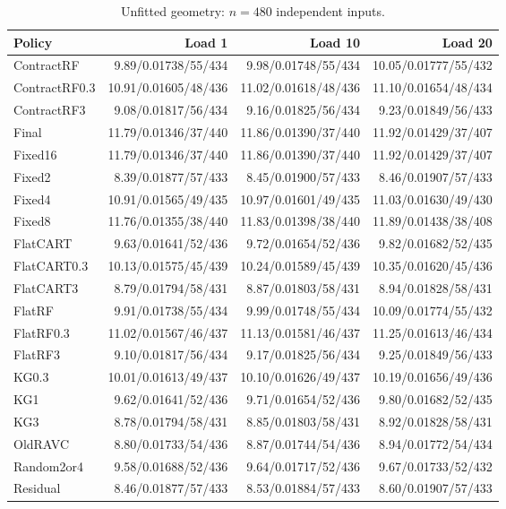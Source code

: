 \begin{table}[!htbp]\centering\scriptsize
\caption{Unfitted geometry: $n=480$ independent inputs.}\label{supp:confirmgeometry_confirmation}
\begin{tabular}{@{}lrrr@{}}\toprule
Policy & Load 1 & Load 10 & Load 20\\\midrule
ContractRF & 9.89/0.01738/55/434 & 9.98/0.01748/55/434 & 10.05/0.01777/55/432\\
ContractRF0.3 & 10.91/0.01605/48/436 & 11.02/0.01618/48/436 & 11.10/0.01654/48/434\\
ContractRF3 & 9.08/0.01817/56/434 & 9.16/0.01825/56/434 & 9.23/0.01849/56/433\\
Final & 11.79/0.01346/37/440 & 11.86/0.01390/37/440 & 11.92/0.01429/37/407\\
Fixed16 & 11.79/0.01346/37/440 & 11.86/0.01390/37/440 & 11.92/0.01429/37/407\\
Fixed2 & 8.39/0.01877/57/433 & 8.45/0.01900/57/433 & 8.46/0.01907/57/433\\
Fixed4 & 10.91/0.01565/49/435 & 10.97/0.01601/49/435 & 11.03/0.01630/49/430\\
Fixed8 & 11.76/0.01355/38/440 & 11.83/0.01398/38/440 & 11.89/0.01438/38/408\\
FlatCART & 9.63/0.01641/52/436 & 9.72/0.01654/52/436 & 9.82/0.01682/52/435\\
FlatCART0.3 & 10.13/0.01575/45/439 & 10.24/0.01589/45/439 & 10.35/0.01620/45/436\\
FlatCART3 & 8.79/0.01794/58/431 & 8.87/0.01803/58/431 & 8.94/0.01828/58/431\\
FlatRF & 9.91/0.01738/55/434 & 9.99/0.01748/55/434 & 10.09/0.01774/55/432\\
FlatRF0.3 & 11.02/0.01567/46/437 & 11.13/0.01581/46/437 & 11.25/0.01613/46/434\\
FlatRF3 & 9.10/0.01817/56/434 & 9.17/0.01825/56/434 & 9.25/0.01849/56/433\\
KG0.3 & 10.01/0.01613/49/437 & 10.10/0.01626/49/437 & 10.19/0.01656/49/436\\
KG1 & 9.62/0.01641/52/436 & 9.71/0.01654/52/436 & 9.80/0.01682/52/435\\
KG3 & 8.78/0.01794/58/431 & 8.85/0.01803/58/431 & 8.92/0.01828/58/431\\
OldRAVC & 8.80/0.01733/54/436 & 8.87/0.01744/54/436 & 8.94/0.01772/54/434\\
Random2or4 & 9.58/0.01688/52/436 & 9.64/0.01717/52/436 & 9.67/0.01733/52/432\\
Residual & 8.46/0.01877/57/433 & 8.53/0.01884/57/433 & 8.60/0.01907/57/433\\
\bottomrule\end{tabular}\end{table}


